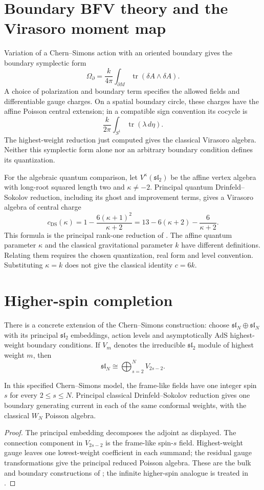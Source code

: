 \section{Boundary BFV theory and the Virasoro moment map}
Variation of a Chern--Simons action with an oriented boundary gives the
boundary symplectic form
\[
 \Omega_{\partial}=\frac{k}{4\pi}
                   \int_{\partial M}\operatorname{tr}(\delta A\wedge\delta A).
\]
A choice of polarization and boundary term specifies the allowed fields
and differentiable gauge charges. On a spatial boundary circle, these
charges have the affine Poisson central extension; in a compatible sign
convention its cocycle is
\[
 \frac{k}{2\pi}\int_{S^1}\operatorname{tr}(\lambda\,d\eta).
\]
The highest-weight reduction just computed gives the classical Virasoro
algebra. Neither this symplectic form alone nor an arbitrary boundary
condition defines its quantization.

For the algebraic quantum comparison, let $V^\kappa(\mathfrak{sl}_2)$ be
the affine vertex algebra with long-root squared length two and
$\kappa\ne-2$. Principal quantum Drinfeld--Sokolov reduction, including
its ghost and improvement terms, gives a Virasoro algebra of central charge
\[
 c_{\mathrm{DS}}(\kappa)
 =1-\frac{6(\kappa+1)^2}{\kappa+2}
 =13-6(\kappa+2)-\frac6{\kappa+2}.
\]
This formula is the principal rank-one reduction of
\cite[Example~5.22]{ArakawaW}.
The affine quantum parameter $\kappa$ and the classical gravitational
parameter $k$ have different definitions. Relating them requires the
chosen quantization, real form and level convention. Substituting
$\kappa=k$ does not give the classical identity $c=6k$.

\section{Higher-spin completion}
There is a concrete extension of the Chern--Simons construction: choose
$\mathfrak{sl}_N\oplus\mathfrak{sl}_N$ with its principal
$\mathfrak{sl}_2$ embeddings, action levels and asymptotically AdS
highest-weight boundary conditions. If $V_m$ denotes the irreducible
$\mathfrak{sl}_2$ module of highest weight $m$, then
\[
 \mathfrak{sl}_N\cong\bigoplus_{s=2}^N V_{2s-2}.
\]

\begin{theorem}
In this specified Chern--Simons model, the frame-like fields have one
integer spin $s$ for every $2\leq s\leq N$. Principal classical
Drinfeld--Sokolov reduction gives one boundary generating current in each
of the same conformal weights, with the classical $W_N$ Poisson algebra.
\end{theorem}
\begin{proof}
The principal embedding decomposes the adjoint as displayed. The connection
component in $V_{2s-2}$ is the frame-like spin-$s$ field. Highest-weight
gauge leaves one lowest-weight coefficient in each summand; the residual
gauge transformations give the principal reduced Poisson algebra.
These are the bulk and boundary constructions of
\cite{CampoleoniHigherSpin}; the infinite higher-spin analogue is treated
in \cite{HenneauxRey}.
\end{proof}

